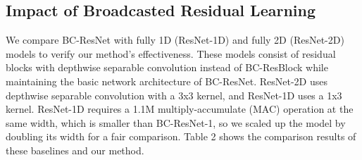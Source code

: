 \documentclass[a4paper]{article}
\begin{document}
\begin{table}[t]
    \caption{\textbf{Impact of Broadcasted Residual Learning and Ablation Study.} We demonstrate how each component affects the base model, BC-ResNet-1, on Google speech command datasets v1 and v2. We show mean and standard deviation of Top-1 test accuracy (\%).  (averaged over 5 seeds).}
    \label{abalation_table}
    \centering
    \vskip -0.1in
\end{table}


\subsection{Impact of Broadcasted Residual Learning}
We compare BC-ResNet with fully 1D (ResNet-1D) and fully 2D (ResNet-2D) models to verify our method's effectiveness. These models consist of residual blocks with depthwise separable convolution instead of BC-ResBlock while maintaining the basic network architecture of BC-ResNet. ResNet-2D uses depthwise separable convolution with a 3x3 kernel, and ResNet-1D uses a 1x3 kernel. ResNet-1D requires a 1.1M multiply-accumulate (MAC) operation at the same width, which is smaller than BC-ResNet-1, so we scaled up the model by doubling its width for a fair comparison. Table 2 shows the comparison results of these baselines and our method.  
\end{document}
